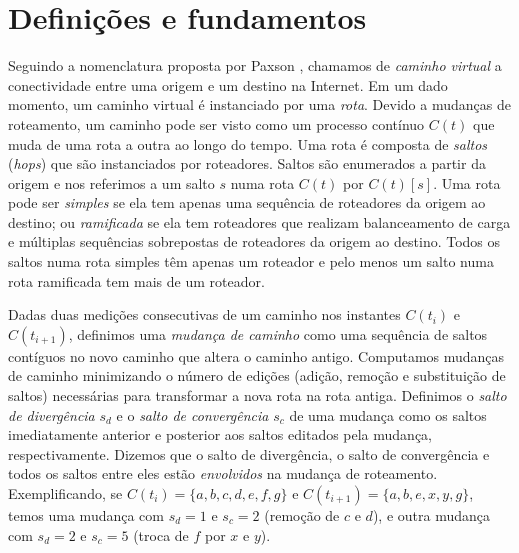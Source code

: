 \section{Definições e fundamentos}
\label{sec:background}

Seguindo a nomenclatura proposta por Paxson \cite{paxson97routing},
chamamos de \emph{caminho virtual} a conectividade entre uma origem e um
destino na Internet.  Em um dado momento, um caminho virtual é
instanciado por uma \emph{rota}.  Devido a mudanças de roteamento, um
caminho pode ser visto como um processo contínuo $C(t)$ que muda de uma
rota a outra ao longo do tempo.  Uma rota é composta de \emph{saltos}
(\emph{hops}) que são instanciados por roteadores.  Saltos são
enumerados a partir da origem e nos referimos a um salto $s$ numa rota
$C(t)$ por $C(t)[s]$.  Uma rota pode ser \emph{simples} se ela tem
apenas uma sequência de roteadores da origem ao destino; ou
\emph{ramificada} se ela tem roteadores que realizam balanceamento de
carga e múltiplas sequências sobrepostas de roteadores da origem ao
destino.  Todos os saltos numa rota simples têm apenas um roteador e
pelo menos um salto numa rota ramificada tem mais de um roteador.

Dadas duas medições consecutivas de um caminho nos instantes $C(t_i)$ e
$C(t_{i+1})$, definimos uma \emph{mudança de caminho} como uma sequência
de saltos contíguos no novo caminho que altera o caminho antigo.
Computamos mudanças de caminho minimizando o número de edições (adição,
remoção e substituição de saltos) necessárias para transformar a nova
rota na rota antiga.  Definimos o \emph{salto de divergência} $s_d$ e o
\emph{salto de convergência} $s_c$ de uma mudança como os saltos
imediatamente anterior e posterior aos saltos editados pela mudança,
respectivamente.  Dizemos que o salto de divergência, o salto de
convergência e todos os saltos entre eles estão \emph{envolvidos} na
mudança de roteamento.  Exemplificando, se $C(t_i) = \{a, b, c, d, e, f,
g\}$ e $C(t_{i+1}) = \{a, b, e, x, y, g\}$, temos uma mudança com $s_d =
1$ e $s_c = 2$ (remoção de $c$ e $d$), e outra mudança com $s_d = 2$ e
$s_c = 5$ (troca de $f$ por $x$ e $y$).
